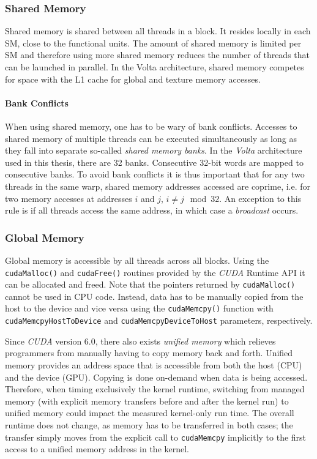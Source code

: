 \subsubsection{Shared Memory}
Shared memory is shared between all threads in a block. It resides locally in each SM, close to the functional units. The amount of shared memory is limited per SM and therefore using more shared memory reduces the number of threads that can be launched in parallel. In the Volta architecture, shared memory competes for space with the L1 cache for global and texture memory accesses.

\paragraph{Bank Conflicts} \label{sec:bank-conflicts}
When using shared memory, one has to be wary of bank conflicts. Accesses to shared memory of multiple threads can be executed simultaneously as long as they fall into separate so-called \emph{shared memory banks}. In the \emph{Volta} architecture used in this thesis, there are 32 banks. Consecutive 32-bit words are mapped to consecutive banks. To avoid bank conflicts it is thus important that for any two threads in the same warp, shared memory addresses accessed are coprime, i.e. for two memory accesses at addresses $i$ and $j$, $i \neq j \mod 32$. An exception to this rule is if all threads access the same address, in which case a \emph{broadcast} occurs.

\subsubsection{Global Memory}    \label{sec:unified-memory}
Global memory is accessible by all threads across all blocks. Using the \texttt{cudaMalloc()} and \texttt{cudaFree()} routines provided by the \emph{CUDA} Runtime API it can be allocated and freed. Note that the pointers returned by \texttt{cudaMalloc()} cannot be used in CPU code. Instead, data has to be manually copied from the host to the device and vice versa using the \texttt{cudaMemcpy()} function with \texttt{cudaMemcpyHostToDevice} and \texttt{cudaMemcpyDeviceToHost} parameters, respectively. 

Since \emph{CUDA} version 6.0, there also exists \emph{unified memory} which relieves programmers from manually having to copy memory back and forth. Unified memory provides an address space that is accessible from both the host (CPU) and the device (GPU). Copying is done on-demand when data is being accessed. Therefore, when timing exclusively the kernel runtime, switching from managed memory (with explicit memory transfers before and after the kernel run) to unified memory could impact the measured kernel-only run time. The overall runtime does not change, as memory has to be transferred in both cases; the transfer simply moves from the explicit call to \texttt{cudaMemcpy} implicitly to the first access to a unified memory address in the kernel.

